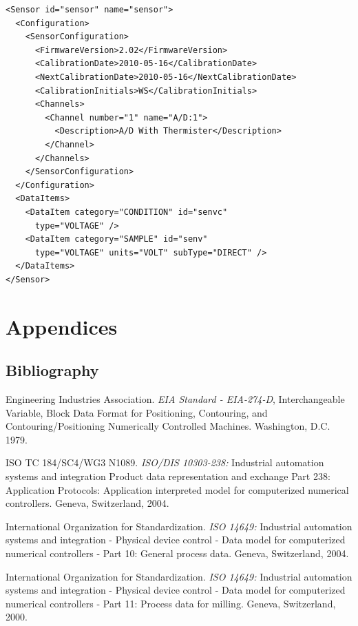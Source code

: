 \documentclass{mtconnect}	%
\begin{document}
\begin{lstlisting}[firstnumber=1,escapechar=|,%
    caption={Example of configuration data for Sensor}, label={lst:example-of-sensor-configuration-data}]
<Sensor id="sensor" name="sensor">
  <Configuration>
    <SensorConfiguration>
      <FirmwareVersion>2.02</FirmwareVersion>
      <CalibrationDate>2010-05-16</CalibrationDate>
      <NextCalibrationDate>2010-05-16</NextCalibrationDate>
      <CalibrationInitials>WS</CalibrationInitials>
      <Channels>
        <Channel number="1" name="A/D:1">
          <Description>A/D With Thermister</Description>
        </Channel>
      </Channels>
    </SensorConfiguration>
  </Configuration>
  <DataItems>
    <DataItem category="CONDITION" id="senvc" 
      type="VOLTAGE" />
    <DataItem category="SAMPLE" id="senv" 
      type="VOLTAGE" units="VOLT" subType="DIRECT" />
  </DataItems>
</Sensor>
\end{lstlisting}




\appendix
\section*{Appendices}
\renewcommand{\thesubsection}{\Alph{subsection}}

\subsection{Bibliography}
\label{Bibliography}

Engineering Industries Association. \textit{EIA Standard - EIA-274-D}, Interchangeable Variable, Block Data Format for Positioning, Contouring, and Contouring/Positioning Numerically Controlled Machines. Washington, D.C. 1979.

ISO TC 184/SC4/WG3 N1089. \textit{ISO/DIS 10303-238:} Industrial automation systems and integration  Product data representation and exchange  Part 238: Application Protocols: Application interpreted model for computerized numerical controllers. Geneva, Switzerland, 2004.

International Organization for Standardization. \textit{ISO 14649:} Industrial automation systems and integration - Physical device control - Data model for computerized numerical controllers - Part 10: General process data. Geneva, Switzerland, 2004.

International Organization for Standardization. \textit{ISO 14649:} Industrial automation systems and integration - Physical device control - Data model for computerized numerical controllers - Part 11: Process data for milling. Geneva, Switzerland, 2000.
\end{document}
